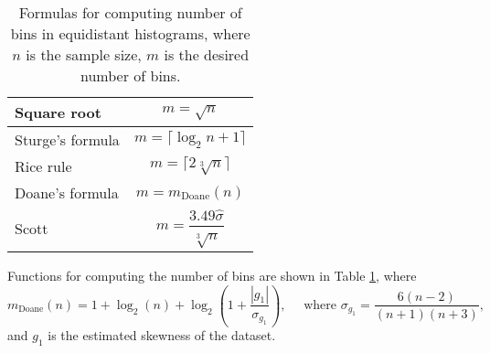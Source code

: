 \begin{table}[ht]
\centering
\caption{Formulas for computing number of bins in equidistant histograms, where $n$ is the sample size, $m$ is the desired number of bins.}

\begin{tabular}{|l | c|}
\hline 
\rule{0pt}{2.4ex} Square root & {$ m = \sqrt{n}$} \\%
\hline 
\rule{0pt}{2.4ex} Sturge's formula \cite{Sturges1926} &$ m = \lceil\log_2 n + 1\rceil$ \\ %
\hline
\rule{0pt}{2.4ex} Rice rule \cite{RiceRule}&  $m = \lceil 2 \sqrt[3]{n}\rceil$ \\ %
\hline
\rule{0pt}{2.4ex} Doane's formula \cite{Doane1976} &  $m =  m_{\mathrm{Doane}}(n)$ \\
\hline
\rule{0pt}{4ex} Scott \cite{Scott1979} &  $m = \dfrac{3.49 \hat{\sigma}}{\sqrt[3]{n}}$ \\
\hline
\end{tabular} 
\label{tab:histNbin}
\end{table}

\noindent Functions for computing the number of bins are shown in Table \ref{tab:histNbin}, where \[ m_{\mathrm{Doane}}(n) = 1 + \log_2 (n) + \log_2 \left( 1 + \dfrac{|g_1|}{\sigma_{g_1}} \right), \quad   \text{ where } \sigma_{g_1} = \frac{6(n-2)}{(n+1)(n+3)},\] and $g_1$ is the estimated skewness of the dataset. 

